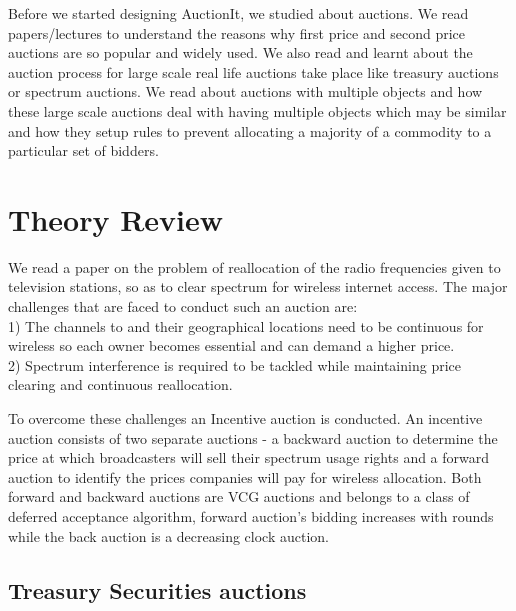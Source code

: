 \documentclass[a4paper]{article}
\begin{document}
Before we started designing AuctionIt, we studied about auctions. We read papers/lectures to understand the reasons why first price and second price auctions are so popular and widely used. We also read and learnt about the auction process for large scale real life auctions take place like treasury auctions or spectrum auctions. We read about auctions with multiple objects and how these large scale auctions deal with having multiple objects which may be similar and how they setup rules to prevent allocating a majority of a commodity to a particular set of bidders.
\section*{Theory Review}


We read a paper on the problem of reallocation of the radio frequencies given to television stations, so as to clear spectrum for wireless internet access. The major challenges that are faced to conduct such an auction are:\\
1) The channels to and their geographical locations need to be continuous for wireless so each owner becomes essential and can demand a higher price.\\
2) Spectrum interference is required to be tackled while maintaining price clearing and continuous reallocation.

To overcome these challenges an Incentive auction is conducted. An incentive auction consists of two separate auctions - a backward auction to determine the price at which broadcasters will sell their spectrum usage rights and a forward auction to identify the prices companies will pay for wireless allocation. Both forward and backward auctions are VCG auctions and belongs to a class of deferred acceptance algorithm, forward auction's bidding increases with rounds while the back auction is a decreasing clock auction.

\subsection*{Treasury Securities auctions}
\end{document}
